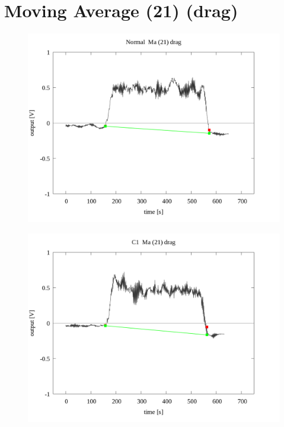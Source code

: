 \documentclass[a4paper]{jsarticle}
\author{}
\title{}
\date{}
\begin{document}
\section{Moving Average (21) (drag)}

\begin{figure}[htbp]
    \footnotesize
    \begin{center}
        \includegraphics[width=140mm]{../../../../33_result/210806/moving_average/21/drag/03/Normal_ma(21)_drag_03.png}
    \end{center}
\end{figure}

\begin{figure}[htbp]
    \footnotesize
    \begin{center}
        \includegraphics[width=140mm]{../../../../33_result/210806/moving_average/21/drag/03/C1_ma(21)_drag_03.png}
    \end{center}
\end{figure}
\end{document}
